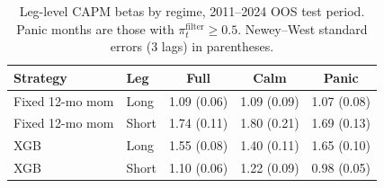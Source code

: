 \begin{table}[H]
\centering
\caption{Leg-level CAPM betas by regime, 2011--2024 OOS test period. Panic months are those with $\pi_t^{\mathrm{filter}} \geq 0.5$. Newey--West standard errors (3 lags) in parentheses.}
\label{tab:leg_betas}
\begin{tabular}{llccc}
\toprule
Strategy & Leg & Full & Calm & Panic \\
\midrule
Fixed 12-mo mom & Long & 1.09 (0.06) & 1.09 (0.09) & 1.07 (0.08) \\
Fixed 12-mo mom & Short & 1.74 (0.11) & 1.80 (0.21) & 1.69 (0.13) \\
\midrule
XGB & Long & 1.55 (0.08) & 1.40 (0.11) & 1.65 (0.10) \\
XGB & Short & 1.10 (0.06) & 1.22 (0.09) & 0.98 (0.05) \\
\bottomrule
\end{tabular}
\end{table}